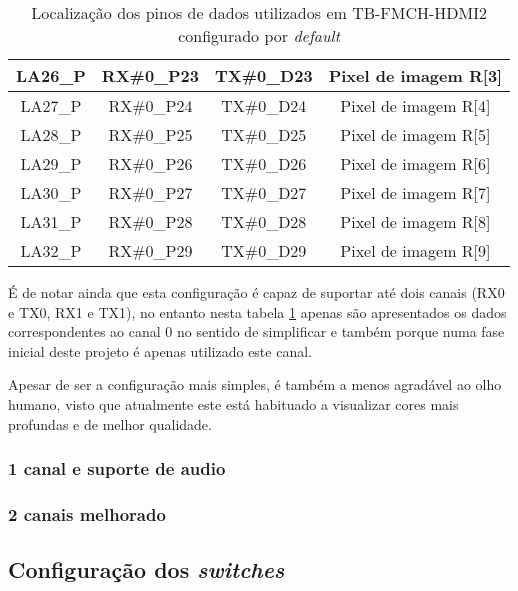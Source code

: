 \begin{table}[h!]
\begin{tabular}{|c|c|c|c|}
		LA26\_P      & RX\#0\_P23                           & TX\#0\_D23                         & Pixel de imagem R{[}3{]} \\ \hline
		LA27\_P      & RX\#0\_P24                           & TX\#0\_D24                         & Pixel de imagem R{[}4{]} \\ \hline
		LA28\_P      & RX\#0\_P25                           & TX\#0\_D25                         & Pixel de imagem R{[}5{]} \\ \hline
		LA29\_P      & RX\#0\_P26                           & TX\#0\_D26                         & Pixel de imagem R{[}6{]} \\ \hline
		LA30\_P      & RX\#0\_P27                           & TX\#0\_D27                         & Pixel de imagem R{[}7{]} \\ \hline
		LA31\_P      & RX\#0\_P28                           & TX\#0\_D28                         & Pixel de imagem R{[}8{]} \\ \hline
		LA32\_P      & RX\#0\_P29                           & TX\#0\_D29                         & Pixel de imagem R{[}9{]} \\ \hline
	\end{tabular}
	\caption{Localização dos pinos de dados utilizados em TB-FMCH-HDMI2 configurado por \textit{default}}
	\label{table:HDMIdataDefaultdetail}
\end{table}

É de notar ainda que esta configuração é capaz de suportar até dois canais (RX0 e TX0, RX1 e TX1), no entanto nesta tabela \ref{table:HDMIdataDefaultdetail} apenas são apresentados os dados correspondentes ao canal 0 no sentido de simplificar e também porque numa fase inicial deste projeto é apenas utilizado este canal.

Apesar de ser a configuração mais simples, é também a menos agradável ao olho humano, visto que atualmente este está habituado a visualizar cores mais profundas e de melhor qualidade. 

\subsubsection{1 canal e suporte de audio} \label {subsubsec:HDMIconfig+audio}


\subsubsection{2 canais melhorado} \label{subsubsec:HDMIconfigMelhorado}

\subsection{Configuração dos \textit{switches}}